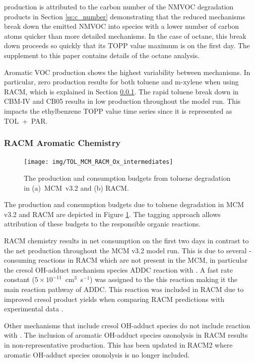  production is attributed to the carbon number of the NMVOC degradation products in Section \ref{ss:c_number} demonstrating that the reduced mechanisms break down the emitted NMVOC into species with a lower number of carbon atoms quicker than more detailed mechanisms. 
In the case of octane, this break down proceeds so quickly that its TOPP value maximum is on the first day. 
The supplement to this paper contains details of the octane analysis.

Aromatic VOC  production shows the highest variability between mechanisms. 
In particular, zero  production results for both toluene and m-xylene when using RACM, which is explained in Section \ref{sss:RACM_aromatic}. 
The rapid toluene break down in CBM-IV and CB05 results in low  production throughout the model run.
This impacts the ethylbenzene TOPP value time series since it is represented as \mbox{TOL + PAR}.

\subsubsection{RACM Aromatic Chemistry} \label{sss:RACM_aromatic}

\begin{figure}
    \begin{center}
        \texttt{[image: img/TOL\_MCM\_RACM\_Ox\_intermediates]}
    \end{center}
    \caption{The  production and consumption budgets from toluene degradation in \mbox{(a) MCM v3.2} and (b) RACM.}
    \label{f:TOL_MCM_RACM}
\end{figure}

The  production and consumption budgets due to toluene degradation in MCM v3.2 and RACM are depicted in Figure \ref{f:TOL_MCM_RACM}. 
The tagging approach allows attribution of these budgets to the responsible organic reactions.

RACM chemistry results in net  consumption on the first two days in contrast to the net  production throughout the MCM v3.2 model run.
This is due to several -consuming reactions in RACM which are not present in the MCM, in particular the cresol OH-adduct mechanism species ADDC reaction with . 
A fast rate constant \mbox{($5 \times 10^{-11}$ cm$^3$ s$^{-1}$)} was assigned to the this reaction making it the main reaction pathway of ADDC. 
This reaction was included in RACM due to improved cresol product yields when comparing RACM predictions with experimental data \citep{Stockwell:1997}.

Other mechanisms that include cresol OH-adduct species do not include reaction with . 
The inclusion of aromatic OH-adduct species ozonolysis in RACM results in non-representative  production. 
This has been updated in RACM2 where aromatic OH-adduct species ozonolysis is no longer included.
